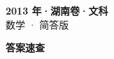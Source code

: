 \documentclass[zihao=-4, a4paper]{ctexart}
\begin{document}
\begin{center}
  {\Large\bfseries 2013 年·湖南卷·文科}\\[4pt]
  {\large 数学 · 简答版}
\end{center}
\medskip
{}

\clearpage
{}
\begin{center}{\Large\bfseries 答案速查}\end{center}
\medskip

\end{document}
